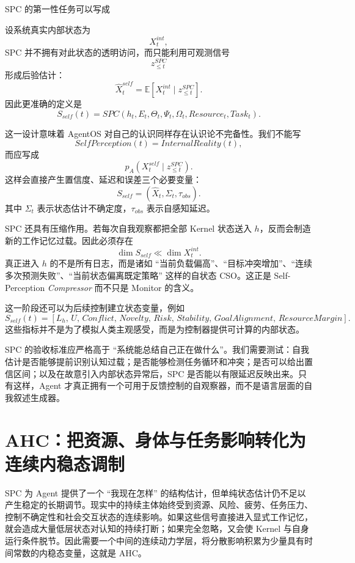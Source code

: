 SPC 的第一性任务可以写成
\begin{statementbox}
\centering
{}
\end{statementbox}
设系统真实内部状态为
\[
X_t^{int},
\]
SPC 并不拥有对此状态的透明访问，而只能利用可观测信号
\[
z_{\le t}^{SPC}
\]
形成后验估计：
\[
\hat X_t^{self}
=
\mathbb E
\left[
X_t^{int}
\mid
z_{\le t}^{SPC}
\right].
\]
因此更准确的定义是
\[
S_{self}(t)
=
SPC(
h_t,E_t,\Theta_t,\Psi_t,\Omega_t,
Resource_t,Task_t
).
\]

这一设计意味着 AgentOS 对自己的认识同样存在认识论不完备性。我们不能写
\[
SelfPerception(t)=InternalReality(t),
\]
而应写成
\[
p_A
\left(
X_t^{self}
\mid
z_{\le t}^{SPC}
\right).
\]
这样会直接产生置信度、延迟和误差三个必要变量：
\[
S_{self}
=
(\hat X_t,\Sigma_t,\tau_{obs}).
\]
其中 $\Sigma_t$ 表示状态估计不确定度，$\tau_{obs}$ 表示自感知延迟。

SPC 还具有压缩作用。若每次自我观察都把全部 Kernel 状态送入 $h$，反而会制造新的工作记忆过载。因此必须存在
\[
\dim S_{self}
\ll
\dim X_t^{int}.
\]
真正进入 $h$ 的不是所有日志，而是诸如 ``当前负载偏高''、``目标冲突增加''、``连续多次预测失败''、``当前状态偏离既定策略'' 这样的自状态 CSO。这正是 Self-Perception \emph{Compressor} 而不只是 Monitor 的含义。

这一阶段还可以为后续控制建立状态变量，例如
\[
S_{self}(t)
=
[
L_h,\,
U,\,
Conflict,\,
Novelty,\,
Risk,\,
Stability,\,
GoalAlignment,\,
ResourceMargin
].
\]
这些指标并不是为了模拟人类主观感受，而是为控制器提供可计算的内部状态。

SPC 的验收标准应严格高于 ``系统能总结自己正在做什么''。我们需要测试：自我估计是否能够提前识别认知过载；是否能够检测任务循环和冲突；是否可以给出置信区间；以及在故意引入内部状态异常后，SPC 是否能以有限延迟反映出来。只有这样，Agent 才真正拥有一个可用于反馈控制的自观察器，而不是语言层面的自我叙述生成器。

\section{AHC：把资源、身体与任务影响转化为连续内稳态调制}

SPC 为 Agent 提供了一个 ``我现在怎样'' 的结构估计，但单纯状态估计仍不足以产生稳定的长期调节。现实中的持续主体始终受到资源、风险、疲劳、任务压力、控制不确定性和社会交互状态的连续影响。如果这些信号直接进入显式工作记忆，就会造成大量低层状态对认知的持续打断；如果完全忽略，又会使 Kernel 与自身运行条件脱节。因此需要一个中间的连续动力学层，将分散影响积累为少量具有时间常数的内稳态变量，这就是 AHC。

